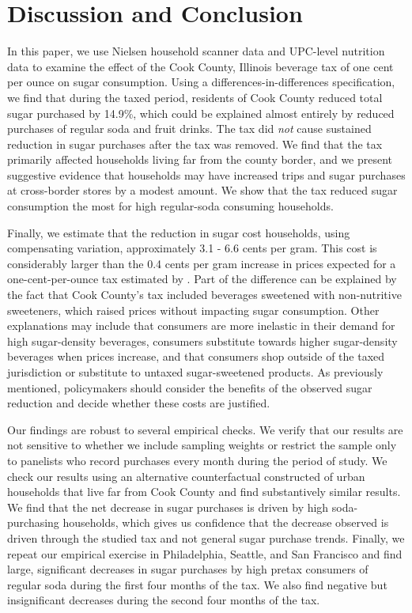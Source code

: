 \documentclass[12pt]{article}
\begin{document}
\section{Discussion and Conclusion} \label{discussion}

In this paper, we use Nielsen household scanner data and UPC-level nutrition data to examine the effect of the Cook County, Illinois beverage tax of one cent per ounce on sugar consumption. Using a differences-in-differences specification, we find that during the taxed period, residents of Cook County reduced total sugar purchased by 14.9\%, which could be explained almost entirely by reduced purchases of regular soda and fruit drinks. The tax did \textit{not} cause sustained reduction in sugar purchases after the tax was removed. We find that the tax primarily affected households living far from the county border, and we present suggestive evidence that households may have increased trips and sugar purchases at cross-border stores by a modest amount. We show that the tax reduced sugar consumption the most for high regular-soda consuming households.

Finally, we estimate that the reduction in sugar cost households, using compensating variation, approximately 3.1 - 6.6 cents per gram. This cost is considerably larger than the 0.4 cents per gram
increase in prices expected for a one-cent-per-ounce tax estimated by \textcite{grummon2019designing}. Part of the difference can be explained by the fact that Cook County's tax included beverages sweetened with non-nutritive sweeteners, which raised prices without impacting sugar consumption. Other explanations may include that consumers are more inelastic in their demand for high sugar-density beverages, consumers substitute towards higher sugar-density beverages when prices increase, and that consumers shop outside of the taxed jurisdiction or substitute to untaxed sugar-sweetened products. As previously mentioned, policymakers should consider the benefits of the observed sugar reduction and decide whether these costs are justified.

Our findings are robust to several empirical checks. We verify that our results are not sensitive to whether we include sampling weights or restrict the sample only to panelists who record purchases every month during the period of study. We check our results using an alternative counterfactual constructed of urban households that live far from Cook County and find substantively similar results. We find that the net decrease in sugar purchases is driven by high soda-purchasing households, which gives us confidence that the decrease observed is driven through the studied tax and not general sugar purchase trends. Finally, we repeat our empirical exercise in Philadelphia, Seattle, and San Francisco and find large, significant decreases in sugar purchases by high pretax consumers of regular soda during the first four months of the tax. We also find negative but insignificant decreases during the second four months of the tax.
\end{document}
